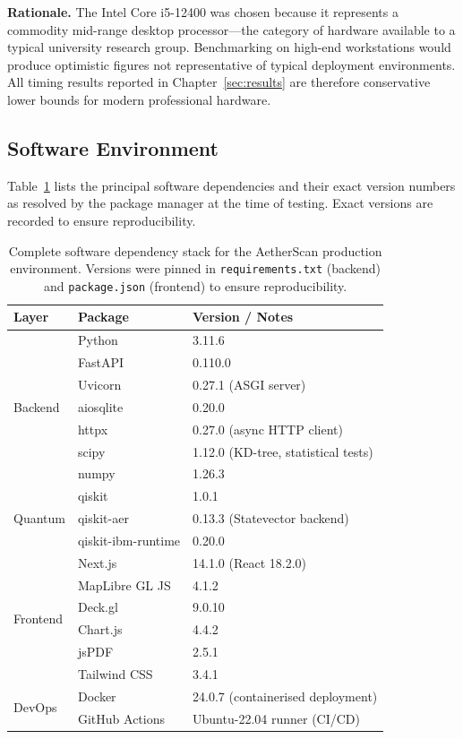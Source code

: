 \documentclass[12pt,a4paper]{article}
\begin{document}
\noindent\textbf{Rationale.}
The Intel Core i5-12400 was chosen because it represents a commodity
mid-range desktop processor---the category of hardware available to a
typical university research group. Benchmarking on high-end workstations
would produce optimistic figures not representative of typical deployment
environments. All timing results reported in Chapter~\ref{sec:results} are
therefore conservative lower bounds for modern professional hardware.

\subsection{Software Environment}
\label{sec:expsetup:software}

Table~\ref{tab:software} lists the principal software dependencies and
their exact version numbers as resolved by the package manager at the
time of testing. Exact versions are recorded to ensure reproducibility.

\begin{table}[H]
\centering
\caption[Software dependencies and versions]{%
Complete software dependency stack for the AetherScan production
environment. Versions were pinned in \texttt{requirements.txt} (backend)
and \texttt{package.json} (frontend) to ensure reproducibility.}
\label{tab:software}
\begin{tabularx}{\textwidth}{@{}llX@{}}
\toprule
\textbf{Layer}    & \textbf{Package}          & \textbf{Version / Notes} \\
\midrule
\multirow{7}{*}{Backend}
  & Python             & 3.11.6 \\
  & FastAPI            & 0.110.0 \\
  & Uvicorn            & 0.27.1 (ASGI server) \\
  & aiosqlite          & 0.20.0 \\
  & httpx              & 0.27.0 (async HTTP client) \\
  & scipy              & 1.12.0 (KD-tree, statistical tests) \\
  & numpy              & 1.26.3 \\
\midrule
\multirow{3}{*}{Quantum}
  & qiskit             & 1.0.1 \\
  & qiskit-aer         & 0.13.3 (Statevector backend) \\
  & qiskit-ibm-runtime & 0.20.0 \\
\midrule
\multirow{6}{*}{Frontend}
  & Next.js            & 14.1.0 (React 18.2.0) \\
  & MapLibre GL JS     & 4.1.2 \\
  & Deck.gl            & 9.0.10 \\
  & Chart.js           & 4.4.2 \\
  & jsPDF              & 2.5.1 \\
  & Tailwind CSS       & 3.4.1 \\
\midrule
\multirow{2}{*}{DevOps}
  & Docker             & 24.0.7 (containerised deployment) \\
  & GitHub Actions     & Ubuntu-22.04 runner (CI/CD) \\
\bottomrule
\end{tabularx}
\end{table}
\end{document}
